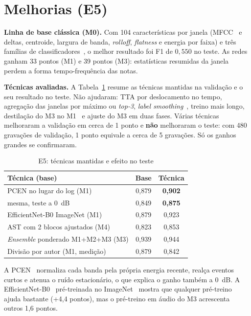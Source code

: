 \documentclass[conference]{IEEEtran}
\begin{document}
\section{Melhorias (E5)}

\textbf{Linha de base clássica (M0).} Com 104 características por janela (MFCC~\cite{davis1980mfcc} e deltas, centroide, largura de banda, \textit{rolloff}, \textit{flatness} e energia por faixa) e três famílias de classificadores~\cite{pedregosa2011sklearn}, o melhor resultado foi F1 de $0{,}550$ no teste. As redes ganham 33 pontos (M1) e 39 pontos (M3): estatísticas resumidas da janela perdem a forma tempo-frequência das notas.

\textbf{Técnicas avaliadas.} A Tabela~\ref{tab:e5} resume as técnicas mantidas na validação e o seu resultado no teste. Não ajudaram: TTA por deslocamento no tempo, agregação das janelas por máximo ou \textit{top-3}, \textit{label smoothing}~\cite{szegedy2016inception}, treino mais longo, destilação do M3 no M1~\cite{hinton2015distilling} e ajuste do M3 em duas fases. Várias técnicas melhoraram a validação em cerca de 1 ponto e \textbf{não} melhoraram o teste: com 480 gravações de validação, 1 ponto equivale a cerca de 5 gravações. Só os ganhos grandes se confirmaram.

\begin{table}[htbp]
\caption{E5: técnicas mantidas e efeito no teste}
\label{tab:e5}
\centering
\footnotesize
\setlength{\tabcolsep}{3pt}
\begin{tabular}{@{}>{\raggedright\arraybackslash}p{3.7cm}cc@{}}
\toprule
\textbf{Técnica (base)} & \textbf{Base} & \textbf{Técnica} \\
\midrule
PCEN no lugar do log (M1) & 0,879 & \textbf{0,902} \\
\quad mesma, teste a 0~dB & 0,849 & \textbf{0,875} \\
EfficientNet-B0 ImageNet (M1) & 0,879 & 0,923 \\
AST com 2 blocos ajustados (M4) & 0,823 & 0,853 \\
\textit{Ensemble} ponderado M1+M2+M3 (M3) & 0,939 & 0,944 \\
Divisão por autor (M1, medição) & 0,879 & 0,842 \\
\bottomrule
\end{tabular}
\end{table}

A PCEN~\cite{wang2017pcen} normaliza cada banda pela própria energia recente, realça eventos curtos e atenua o ruído estacionário, o que explica o ganho também a 0~dB. A EfficientNet-B0~\cite{tan2019efficientnet} pré-treinada no ImageNet~\cite{deng2009imagenet} mostra que qualquer pré-treino ajuda bastante (+4{,}4 pontos), mas o pré-treino em áudio do M3 acrescenta outros 1{,}6 pontos.
\end{document}
